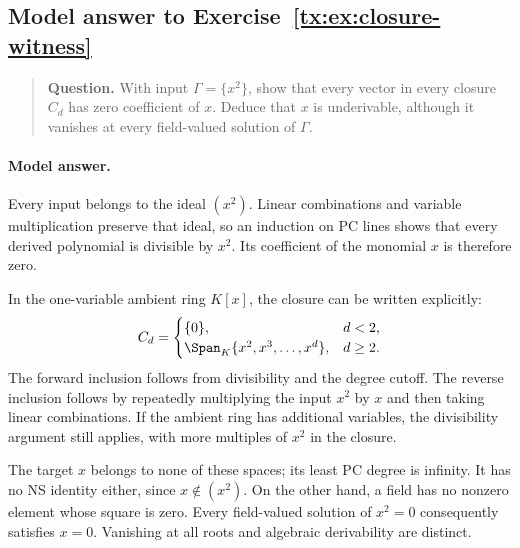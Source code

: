 \documentclass[11pt,a4paper,oneside,openany]{book}
\theoremstyle{definition}\newtheorem{definition}[theorem]{Definition}
\theoremstyle{remark}\newtheorem{remark}[theorem]{Remark}
\numberwithin{equation}{chapter}
\begin{document}
\begin{samepage}

\subsection*{Model answer to Exercise~\ref{tx:ex:closure-witness}}\label{tx:ans:closure-witness}

\begin{quote}\small\textbf{Question.} With input $\Gamma=\{x^2\}$, show that every vector in every closure
$C_d$ has zero coefficient of $x$. Deduce that $x$ is underivable,
although it vanishes at every field-valued solution of $\Gamma$.
\end{quote}

\paragraph{Model answer.}
Every input belongs to the ideal \((x^2)\). Linear combinations and
variable multiplication preserve that ideal, so an induction on PC
lines shows that every derived polynomial is divisible by \(x^2\).
Its coefficient of the monomial \(x\) is therefore zero.
\end{samepage}

In the one-variable ambient ring \(K[x]\), the closure can be written
explicitly:
\[
 C_d=
 \begin{cases}
 \{0\},&d<2,\\
 \Span_K\{x^2,x^3,\ldots,x^d\},&d\ge2.
 \end{cases}
\]
The forward inclusion follows from divisibility and the degree
cutoff. The reverse inclusion follows by repeatedly multiplying the
input \(x^2\) by \(x\) and then taking linear combinations.
If the ambient ring has additional variables, the divisibility
argument still applies, with more multiples of \(x^2\) in the closure.

The target \(x\) belongs to none of these spaces; its least PC
degree is infinity. It has no NS identity either, since \(x\notin(x^2)\).
On the other hand, a field has no nonzero element whose square is
zero. Every field-valued solution of \(x^2=0\) consequently satisfies
\(x=0\). Vanishing at all roots and algebraic derivability are distinct.


\par
\end{document}
